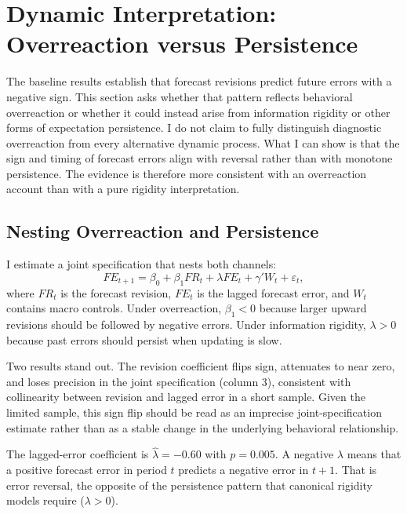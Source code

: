 \section{Dynamic Interpretation: Overreaction versus Persistence}%
\label{sec:interpretation} %

The baseline results establish that forecast revisions
predict future errors with a negative sign.
This section asks whether that pattern reflects behavioral
overreaction or whether it could instead arise from
information rigidity or other forms of expectation
persistence.
I do not claim to fully distinguish diagnostic
overreaction from every alternative dynamic process.
What I can show is that the sign and timing of forecast
errors align with reversal rather than with monotone
persistence.
The evidence is therefore more consistent with an
overreaction account than with a pure rigidity
interpretation.

\subsection{Nesting Overreaction and Persistence}%
\label{sec:horse_race}

I estimate a joint specification that nests both channels:
\begin{equation}\label{eq:horse_race}
  FE_{t+1} = \beta_0 + \beta_1 FR_t
    + \lambda FE_t + \gamma' W_t + \varepsilon_t,
\end{equation}
where $FR_t$ is the forecast revision,
$FE_t$ is the lagged forecast error,
and $W_t$ contains macro controls.
Under overreaction, $\beta_1<0$ because larger
upward revisions should be followed by negative errors.
Under information rigidity, $\lambda>0$ because past
errors should persist when updating is slow.

Two results stand out.
The revision coefficient flips sign, attenuates to
near zero, and loses precision in the joint specification
(column 3), consistent with collinearity between revision
and lagged error in a short sample.
Given the limited sample, this sign flip should be read as
an imprecise joint-specification estimate rather than as a
stable change in the underlying behavioral relationship.

The lagged-error coefficient is
$\hat{\lambda}=-0.60$ with $p=0.005$.
A negative $\lambda$ means that a positive forecast error
in period $t$ predicts a negative error in $t+1$.
That is error reversal, the opposite of the persistence
pattern that canonical rigidity models require
($\lambda>0$).

